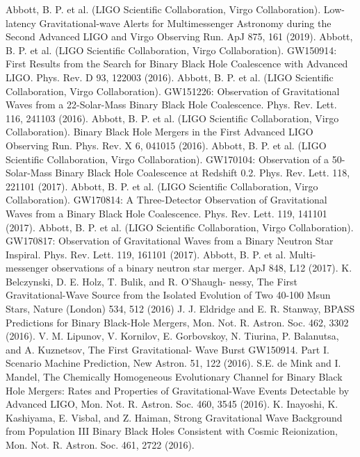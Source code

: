 \documentclass[binding=0.6cm, LaM]{sapthesis}
\begin{document}
\begin{thebibliography}{500}
	 Abbott, B. P. et al. (LIGO Scientific Collaboration, Virgo Collaboration). Low-latency Gravitational-wave Alerts for Multimessenger Astronomy during the Second Advanced LIGO and Virgo Observing Run. ApJ 875, 161 (2019). 
	 Abbott, B. P. et al. (LIGO Scientific Collaboration, Virgo Collaboration). GW150914: First Results from the Search for Binary Black Hole Coalescence with Advanced LIGO. Phys. Rev. D 93, 122003 (2016). 
	 Abbott, B. P. et al. (LIGO Scientific Collaboration, Virgo Collaboration). GW151226: Observation of Gravitational Waves from a 22-Solar-Mass Binary Black Hole Coalescence. Phys. Rev. Lett. 116, 241103 (2016). 
	 Abbott, B. P. et al. (LIGO Scientific Collaboration, Virgo Collaboration). Binary Black Hole Mergers in the First Advanced LIGO Observing Run. Phys. Rev. X 6, 041015 (2016).
	 Abbott, B. P. et al. (LIGO Scientific Collaboration, Virgo Collaboration). GW170104: Observation of a 50-Solar-Mass Binary Black Hole Coalescence at Redshift 0.2. Phys. Rev. Lett. 118, 221101 (2017).
	 Abbott, B. P. et al. (LIGO Scientific Collaboration, Virgo Collaboration). GW170814: A Three-Detector Observation of Gravitational Waves from a Binary Black Hole Coalescence. Phys. Rev. Lett. 119, 141101 (2017).
	 Abbott, B. P. et al. (LIGO Scientific Collaboration, Virgo Collaboration). GW170817: Observation of Gravitational Waves from a Binary Neutron Star Inspiral. Phys. Rev. Lett. 119, 161101 (2017).         
	 Abbott, B. P. et al. Multi-messenger observations of a binary neutron star merger. ApJ 848, L12 (2017).
	 K. Belczynski, D. E. Holz, T. Bulik, and R. O’Shaugh- nessy, The First Gravitational-Wave Source from the Isolated Evolution of Two 40-100 Msun Stars, Nature (London) 534, 512 (2016)
	 J. J. Eldridge and E. R. Stanway, BPASS Predictions for Binary Black-Hole Mergers, Mon. Not. R. Astron. Soc. 462, 3302 (2016).
	 V. M. Lipunov, V. Kornilov, E. Gorbovskoy, N. Tiurina, P. Balanutsa, and A. Kuznetsov, The First Gravitational- Wave Burst GW150914. Part I. Scenario Machine Prediction, New Astron. 51, 122 (2016).
	 S.E. de Mink and I. Mandel, The Chemically Homogeneous Evolutionary Channel for Binary Black Hole Mergers: Rates and Properties of Gravitational-Wave Events Detectable by Advanced LIGO, Mon. Not. R. Astron. Soc. 460, 3545 (2016).
 	 K. Inayoshi, K. Kashiyama, E. Visbal, and Z. Haiman, Strong Gravitational Wave Background from Population III Binary Black Holes Consistent with Cosmic Reionization, Mon. Not. R. Astron. Soc. 461, 2722 (2016).

\end{thebibliography}
\end{document}
